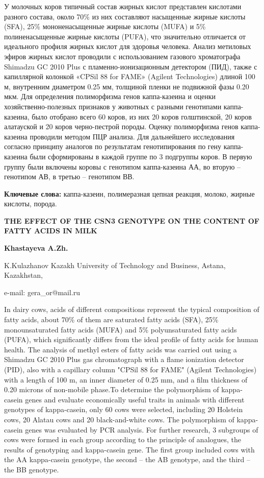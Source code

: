 У молочных коров типичный состав жирных кислот представлен кислотами
разного состава, около 70\% из них составляют насыщенные жирные кислоты
(SFA), 25\% мононенасыщенные жирные кислоты (MUFA) и 5\%
полиненасыщенные жирные кислоты (PUFA), что значительно отличается от
идеального профиля жирных кислот для здоровья человека. Анализ метиловых
эфиров жирных кислот проводили с использованием газового хроматографа
Shimadzu GC 2010 Plus с пламенно-ионизационным детектором (ПИД), также с
капиллярной колонкой «CPSil 88 for FAME» (Agilent Technologies) длиной
100 м, внутренним диаметром 0.25 мм, толщиной пленки не подвижной фазы
0.20 мкм. Для определения полиморфизма генов каппа-казеина и оценки
хозяйственно-полезных признаков у животных с разными генотипами
каппа-казеина, было отобрано всего 60 коров, из них 20 коров
голштинской, 20 коров алатауской и 20 коров черно-пестрой породы. Оценку
полиморфизма генов каппа-казеина проводили методом ПЦР анализа. Для
дальнейшего исследования согласно принципу аналогов по результатам
генотипирования по гену каппа-казеина были сформированы в каждой группе
по 3 подгруппы коров. В первую группу были включены коровы с генотипом
каппа-казеина АА, во вторую -- генотипом АВ, в третью -- генотипом ВВ.

{\bfseries Ключевые слова:} каппа-казеин, полимеразная цепная реакция,
молоко, жирные кислоты, порода.

{\bfseries THE EFFECT OF THE CSN3 GENOTYPE ON THE CONTENT OF FATTY ACIDS IN
MILK}

{\bfseries Khastayeva A.Zh.}

K.Kulazhanov Kazakh University of Technology and Business, Astana,
Kazakhstan,

e-mail: gera\_or@mail.ru

In dairy cows, acids of different compositions represent the typical
composition of fatty acids, about 70\% of them are saturated fatty acids
(SFA), 25\% monounsaturated fatty acids (MUFA) and 5\% polyunsaturated
fatty acids (PUFA), which significantly differs from the ideal profile
of fatty acids for human health. The analysis of methyl esters of fatty
acids was carried out using a Shimadzu GC 2010 Plus gas chromatograph
with a flame ionization detector (PID), also with a capillary column
"CPSil 88 for FAME" (Agilent Technologies) with a length of 100 m, an
inner diameter of 0.25 mm, and a film thickness of 0.20 microns of
non-mobile phase.To determine the polymorphism of kappa-casein genes and
evaluate economically useful traits in animals with different genotypes
of kappa-casein, only 60 cows were selected, including 20 Holstein cows,
20 Alatau cows and 20 black-and-white cows. The polymorphism of
kappa-casein genes was evaluated by PCR analysis. For further research,
3 subgroups of cows were formed in each group according to the principle
of analogues, the results of genotyping and kappa-casein gene. The first
group included cows with the AA kappa-casein genotype, the second -- the
AB genotype, and the third -- the BB genotype.

